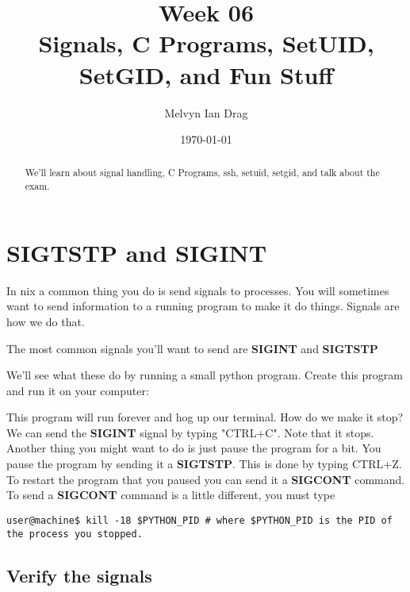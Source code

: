 \documentclass[12pt]{article}
\title{\textbf{Week 06} \\
\Large Signals, C Programs, SetUID, SetGID, and Fun Stuff }
\author{
	Melvyn Ian Drag
}
\date{\today}
\begin{document}
\maketitle

\begin{abstract}
We'll learn about signal handling, C Programs, ssh, setuid, setgid, and talk about the exam.
\end{abstract}

\section{SIGTSTP and SIGINT}
In \*nix a common thing you do is send signals to processes. You will sometimes want to send information to a running program to make it do things. Signals are how we do that. 

The most common signals you'll want to send are \textbf{SIGINT} and \textbf{SIGTSTP}

We'll see what these do by running a small python program. Create this program and run it on your computer:



This program will run forever and hog up our terminal. How do we make it stop? We can send the \textbf{SIGINT} signal by typing "CTRL+C". Note that it stops. Another thing you might want to do is just pause the program for a bit. You pause the program by sending it a \textbf{SIGTSTP}. This is done by typing CTRL+Z. To restart the program that you paused you can send it a \textbf{SIGCONT} command. To send a \textbf{SIGCONT} command is a little different, you must type

\begin{lstlisting}
user@machine$ kill -18 $PYTHON_PID # where $PYTHON_PID is the PID of the process you stopped.
\end{lstlisting}

\subsection{Verify the signals}
\end{document}
